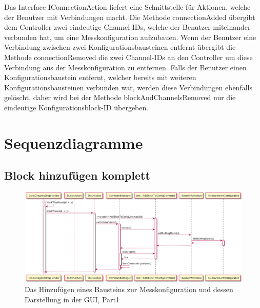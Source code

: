 \documentclass[parskip=full]{scrartcl}
\begin{document}
Das Interface IConnectionAction liefert eine Schnittstelle für Aktionen, welche der Benutzer mit Verbindungen macht. 
Die Methode connectionAdded übergibt dem Controller zwei eindeutige Channel-IDs, welche der Benutzer miteinander verbunden hat, um eine Messkonfiguration aufzubauen.
Wenn der Benutzer eine Verbindung zwischen zwei Konfigurationsbausteinen entfernt übergibt die Methode connectionRemoved die zwei Channel-IDs an den Controller um diese Verbindung aus der Messkonfiguration zu entfernen.
Falls der Benutzer einen Konfigurationsbaustein entfernt, welcher bereits mit weiteren Konfigurationsbausteinen verbunden war, werden diese Verbindungen ebenfalls gelöscht, daher wird bei der Methode blockAndChannelsRemoved nur die eindeutige Konfigurationsblock-ID übergeben.

\clearpage
\section{Sequenzdiagramme}

\subsection{Block hinzufügen komplett}

\begin{figure}[htbp]
	\begin{center}
		\includegraphics[width = 16cm]{Grafiken/SeqAddBPart1.png}
		\caption{Das Hinzufügen eines Bausteins zur Messkonfiguration und dessen Darstellung in der GUI, Part1}
		\label{SeqAddBPart1}
	\end{center}
\end{figure}
\end{document}
